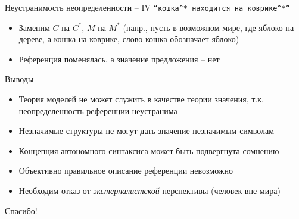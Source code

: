 \documentclass{beamer}
\begin{document}
\begin{frame}{Неустранимость неопределенности -- IV}
\texttt{``кошка$^*$ находится на коврике$^*$''}
\bigskip
\begin{itemize}
	\item Заменим $C$ на $C^*$, $M$ на $M^*$ (напр., пусть в возможном мире, где яблоко на дереве, а кошка на коврике, слово кошка обозначает яблоко)
	\item Референция поменялась, а значение предложения -- нет
\end{itemize}
\end{frame}

\begin{frame}{Выводы}
\begin{itemize}
    \item Теория моделей не может служить в качестве теории значения, т.к. неопределенность референции неустранима
    \item Незначимые структуры не могут дать значение незначимым символам
    \item Концепция автономного синтаксиса может быть подвергнута сомнению
    \item Объективно правильное описание референции невозможно
    \item Необходим отказ от \textit{экстерналистской} перспективы (человек вне мира)
\end{itemize}
\end{frame}


\begin{frame}{}
    \thispagestyle{empty}
    \begin{center}
        {\large Спасибо!}
    \end{center}
\end{frame}


\end{document}
